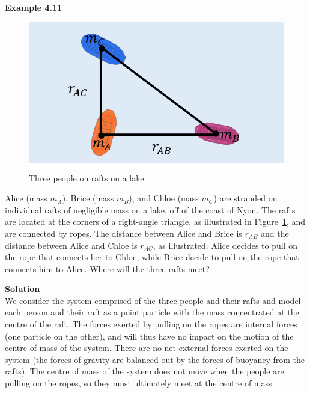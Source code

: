 \begin{framed}
\textbf{Example 4.11}\\
\begin{figure}[!htbp]
\centering
\includegraphics[width=0.7\linewidth]{files/cmraft-2ce0a582e824c4cb4f6807c04093e5f7.png}
\caption[]{Three people on rafts on a lake.}
\label{fig:momentumandcm:cmraft}
\end{figure}

Alice (mass $m_A$), Brice (mass $m_B$), and Chloe (mass $m_C$) are stranded on individual rafts of negligible mass on a lake, off of the coast of Nyon. The rafts are located at the corners of a right-angle triangle, as illustrated in Figure~\ref{fig:momentumandcm:cmraft}, and are connected by ropes. The distance between Alice and Brice is $r_{AB}$ and the distance between Alice and Chloe is $r_{AC}$, as illustrated. Alice decides to pull on the rope that connects her to Chloe, while Brice decide to pull on the rope that connects him to Alice. Where will the three rafts meet?

\begin{framed}
\textbf{Solution}\\
We consider the system comprised of the three people and their rafts and model each person and their raft as a point particle with the mass concentrated at the centre of the raft. The forces exerted by pulling on the ropes are internal forces (one particle on the other), and will thus have no impact on the motion of the centre of mass of the system. There are no net external forces exerted on the system (the forces of gravity are balanced out by the forces of buoyancy from the rafts). The centre of mass of the system does not move when the people are pulling on the ropes, so they must ultimately meet at the centre of mass.


\end{framed}
\end{framed}
